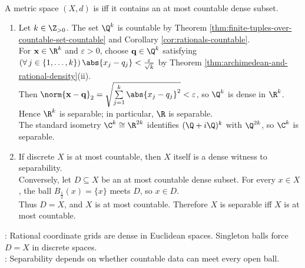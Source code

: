 \begin{definition} \label{def:separable-metric-space} \\
A metric space $(X,d)$ is  iff it contains an at most countable dense subset.
\end{definition}

\begin{example} \label{ex:separable-and-nonseparable-metric-spaces} 
\begin{enumerate}[label=(\roman*)]
\setlength{\itemsep}{0pt}
\item Let $k\in\Z_{>0}$. The set $\Q^k$ is countable by Theorem \ref{thm:finite-tuples-over-countable-set-countable} and Corollary \ref{cor:rationals-countable}.\\
For $\mathbf{x}\in\R^k$ and $\varepsilon>0$, choose $\mathbf{q}\in\Q^k$ satisfying $(\forall\,j\in\{1,\ldots,k\})\,\abs{x_j-q_j}<\frac{\varepsilon}{\sqrt{k}}$ by Theorem \ref{thm:archimedean-and-rational-density}(ii).\\
Then $\norm{\mathbf{x}-\mathbf{q}}_2=\sqrt{\sum\limits_{j=1}^{k}\abs{x_j-q_j}^2}<\varepsilon$, so $\Q^k$ is dense in $\R^k$. Hence $\R^k$ is separable; in particular, $\R$ is separable.\\
The standard isometry $\C^k\cong\R^{2k}$ identifies $(\Q+i\Q)^k$ with $\Q^{2k}$, so $\C^k$ is separable.
\item If discrete $X$ is at most countable, then $X$ itself is a dense witness to separability.\\
Conversely, let $D\subseteq X$ be an at most countable dense subset. For every $x\in X$, the ball $B_{\frac12}(x)=\{x\}$ meets $D$, so $x\in D$.\\
Thus $D=X$, and $X$ is at most countable. Therefore $X$ is separable iff $X$ is at most countable.
\end{enumerate}
: Rational coordinate grids are dense in Euclidean spaces. Singleton balls force $D=X$ in discrete spaces.\\
: Separability depends on whether countable data can meet every open ball.
\end{example}

